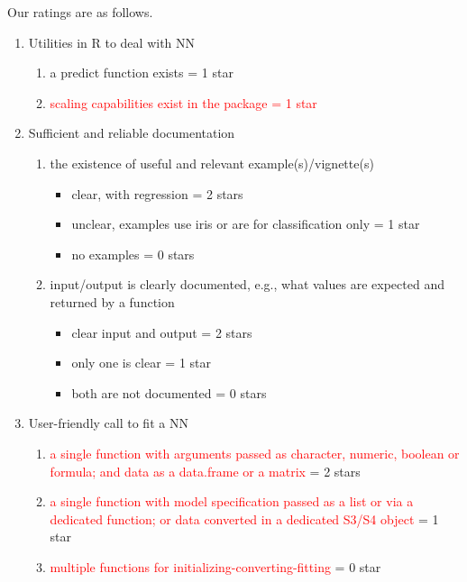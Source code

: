 Our ratings are as follows.

\begin{enumerate}
\def\labelenumi{\arabic{enumi}.}
\tightlist
\item
  Utilities in \textsf{R} to deal with NN

  \begin{enumerate}
  \def\labelenumii{\alph{enumii}.}
  \tightlist
  \item
    a predict function exists = 1 star
  \item
    \textcolor{red}{scaling capabilities exist in the package = 1 star}
  \end{enumerate}
\item
  Sufficient and reliable documentation

  \begin{enumerate}
  \def\labelenumii{\alph{enumii}.}
  \tightlist
  \item
    the existence of useful and relevant example(s)/vignette(s)

    \begin{itemize}
    \tightlist
    \item
      clear, with regression = 2 stars
    \item
      unclear, examples use iris or are for classification only = 1 star
    \item
      no examples = 0 stars
    \end{itemize}
  \item
    input/output is clearly documented, e.g., what values are expected
    and returned by a function

    \begin{itemize}
    \tightlist
    \item
      clear input and output = 2 stars
    \item
      only one is clear = 1 star
    \item
      both are not documented = 0 stars
    \end{itemize}
  \end{enumerate}
\item
  User-friendly call to fit a NN

  \begin{enumerate}
  \def\labelenumii{\alph{enumii}.}
  \tightlist
  \item
    \textcolor{red}{a single function with arguments passed as character, numeric, boolean or formula; and data as a data.frame or a matrix}
    = 2 stars
  \item
    \textcolor{red}{a single function with model specification passed as a list or via a dedicated function; or data converted in a dedicated S3/S4 object}
    = 1 star
  \item
    \textcolor{red}{multiple functions for initializing-converting-fitting}
    = 0 star
  \end{enumerate}
\end{enumerate}

